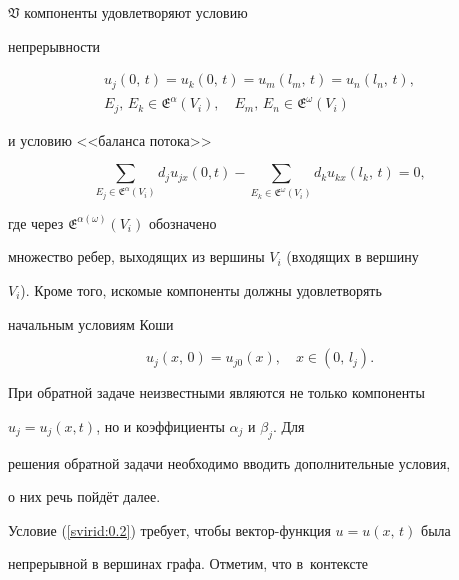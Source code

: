 $\mathfrak{V}$ компоненты удовлетворяют условию

непрерывности

\begin{equation}\label{svirid:0.2}

\begin{split}

u_j(0,\, t)=u_k(0,\, t)=u_m(l_m,\, t)=u_n(l_n,\, t),\\

E_j,\, E_k\in \mathfrak{E}^\alpha(V_i), \quad E_m,\, E_n\in

\mathfrak{E}^\omega(V_i)

\end{split}

\end{equation}

и условию <<баланса потока>>

\begin{equation}\label{svirid:0.3}

\sum\limits_{E_j\in \mathfrak{E}^\alpha(V_i)}d_ju_{jx}(0,

t)-\sum\limits_{E_k\in \mathfrak{E}^\omega(V_i)}d_ku_{kx}(l_k,\, t)=0,

\end{equation}

где через $\mathfrak{E}^{\alpha(\omega)}(V_i)$ обозначено

множество ребер, выходящих из вершины $V_i$ (вхо\-дя\-щих в вершину

$V_i$). Кроме того, искомые компоненты должны удовлетворять

начальным условиям Коши

\begin{equation}\label{svirid:0.4}

u_j(x,\, 0)=u_{j0}(x), \quad x\in(0,\, l_j).

\end{equation}

При обратной задаче неизвестными являются не только компоненты

$u_j=u_j(x, t)$, но и коэффициенты $\alpha_j$ и $\beta_j$. Для

решения обратной задачи не\-об\-хо\-ди\-мо вводить дополнительные условия,

о них речь пойдёт далее.



Условие (\ref{svirid:0.2}) требует, чтобы вектор-функция $u=u(x,\, t)$ была

не\-пре\-рыв\-ной в вершинах графа. Отметим, что в~контексте

